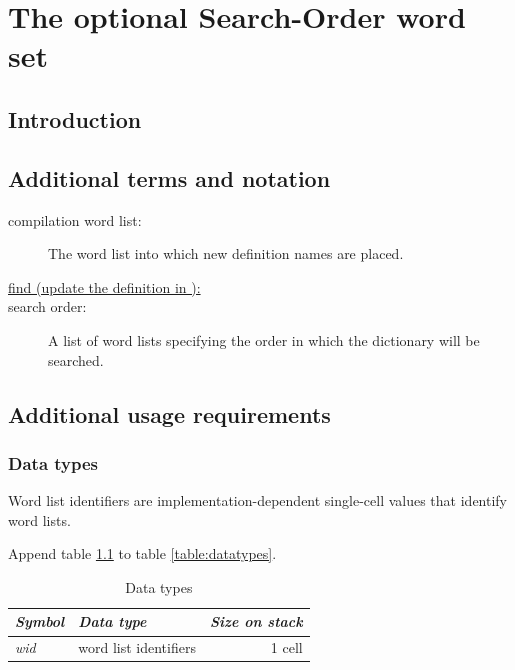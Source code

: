 
\chapter{The optional Search-Order word set} %

\section{Introduction} %

\section{Additional terms and notation} %
\label{search:terms}

\begin{description}
\item[compilation word list:]
	The word list into which new definition names are placed.

\item[\uline{find (update the definition in ):}]

\item[search order:]
	A list of word lists specifying the order in which the
	dictionary will be searched.
\end{description}

\section{Additional usage requirements} %

\subsection{Data types} %

Word list identifiers are implementation-dependent single-cell
values that identify word lists.

Append table \ref{search:types} to table \ref{table:datatypes}.

\begin{table}[h]
  \begin{center}
	\caption{Data types}
	\label{search:types}
	\begin{tabular}{llr}
	\hline\hline
	\emph{Symbol} & \emph{Data type} & \emph{Size on stack} \\
	\hline
	\emph{wid}		& word list identifiers	& 1 cell \\
	\hline\hline
	\end{tabular}
  \end{center}
\end{table}


